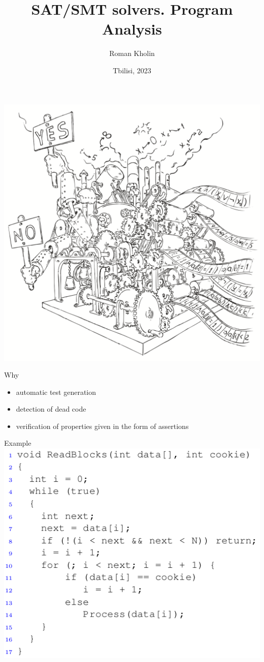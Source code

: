 \documentclass{beamer}
\begin{document}
\title{SAT/SMT solvers. Program Analysis}
\author{Roman Kholin}
\date{Tbilisi, 2023}

\begin{frame}
\includegraphics[scale=0.5]{../decision-procedure.png}
\end{frame}

\frame{\titlepage}

\begin{frame}{Why}
\begin{itemize}
\item automatic test generation
\item detection of dead code
\item verification of properties given in the form of assertions
\end{itemize}
\end{frame}

\begin{frame}{Example}
\includegraphics[scale=0.5]{example1.png}
\end{frame}
\end{document}
